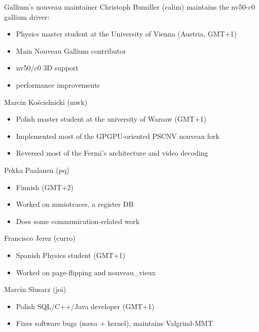 \documentclass[11pt,english,compress]{beamer}
\begin{document}
		\begin{frame}
			\begin{block}{Gallium's nouveau maintainer}
				Christoph Bumiller (calim) maintains the nv50-c0 gallium driver:
				\begin{itemize}
					\item Physics master student at the University of Vienna (Austria, GMT+1)
					\item Main Nouveau Gallium contributor
					\item nv50/c0 3D support
					\item performance improvements
				\end{itemize}
			\end{block}

			\begin{block}{Marcin Kościelnicki (mwk)}
				\begin{itemize}
					\item Polish master student at the university of Warsaw (GMT+1)
					\item Implemented most of the GPGPU-oriented PSCNV nouveau fork
					\item Reversed most of the Fermi's architecture and video decoding
				\end{itemize}
			\end{block}
		\end{frame}

		\begin{frame}
			\begin{block}{Pekka Paalanen (pq)}
				\begin{itemize}
					\item Finnish (GMT+2)
					\item Worked on mmiotraces, a register DB
					\item Does some communication-related work
				\end{itemize}
			\end{block}

			\begin{block}{Francisco Jerez (curro)}
				\begin{itemize}
					\item Spanish Physics student (GMT+1)
					\item Worked on page-flipping and nouveau\_vieux
				\end{itemize}
			\end{block}

			\begin{block}{Marcin Slusarz (joi)}
				\begin{itemize}
					\item Polish SQL/C++/Java developer (GMT+1)
					\item Fixes software bugs (mesa + kernel), maintains Valgrind-MMT
				\end{itemize}
			\end{block}
		\end{frame}
\end{document}

